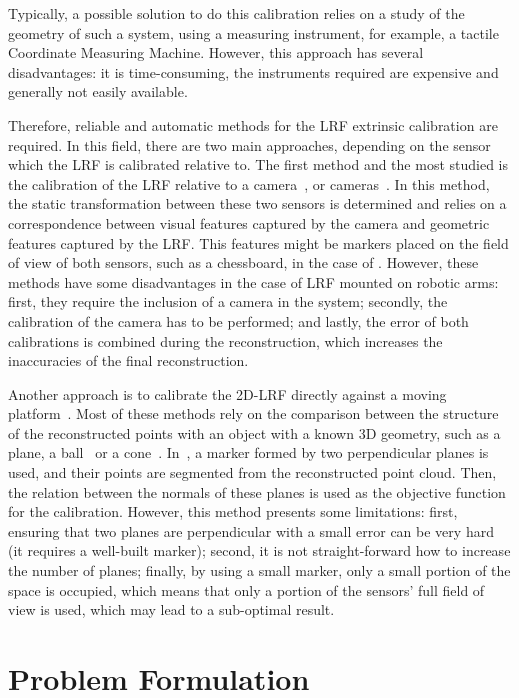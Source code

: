 \documentclass[conference]{IEEEtran}
\begin{document}
Typically, a possible solution to do this calibration relies on a study of the geometry of such a system, using a measuring instrument, for example, a tactile Coordinate Measuring Machine. However, this approach has several disadvantages: it is time-consuming, the instruments required are expensive and generally not easily available.

Therefore, reliable and automatic methods for the LRF extrinsic calibration are required. In this field, there are two main approaches, depending on the sensor which the LRF is calibrated relative to. The first method and the most studied is the calibration of the LRF relative to a camera~\cite{chen16,vasconcelos12}, or cameras~\cite{haeselich12}. In this method, the static transformation between these two sensors is determined and relies on a correspondence between visual features captured by the camera and geometric features captured by the LRF. This features might be markers placed on the field of view of both sensors, such as a chessboard, in the case of \cite{kassir10}. However, these methods have some disadvantages in the case of LRF mounted on robotic arms: first, they require the inclusion of a camera in the system; secondly, the calibration of the camera has to be performed; and lastly, the error of both calibrations is combined during the reconstruction, which increases the inaccuracies of the final reconstruction. 

Another approach is to calibrate the 2D-LRF directly against a moving platform~\cite{zeng18}. Most of these methods rely on the comparison between the structure of the reconstructed points with an object with a known 3D geometry, such as a plane, a ball~\cite{pereira16} or a cone~\cite{almeida12}. In~\cite{kim13}, a marker formed by two perpendicular planes is used, and their points are segmented from the reconstructed point cloud. Then, the relation between the normals of these planes is used as the objective function for the calibration. However, this method presents some limitations: first, ensuring that two planes are perpendicular with a small error can be very hard (it requires a well-built marker); second, it is not straight-forward how to increase the number of planes; finally, by using a small marker, only a small portion of the space is occupied, which means that only a portion of the sensors' full field of view is used, which may lead to a sub-optimal result.

\section{Problem Formulation}\label{section:problem-formulation}
\end{document}
